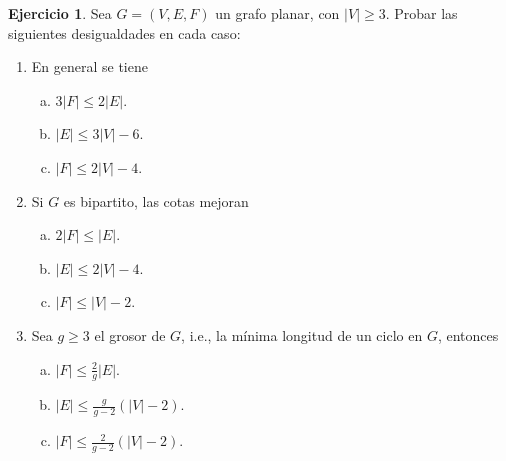 \documentclass[12pt]{report}
\theoremstyle{plain}
\theoremstyle{definition}
\newtheorem{exercise}[theorem]{Ejercicio}
\newcommand{\abs}[1]{\left \vert #1 \right \vert}
\begin{document}
\begin{exercise}\label{ejercicio:desigualdades para cantidad de caras aristas y vertices de grafos planares}
Sea $G = (V,E,F)$ un grafo planar, con $\abs V \geq 3$. Probar las siguientes desigualdades en cada caso:
\begin{enumerate}
\item En general se tiene
\begin{enumerate}[(a)]
\item $3 \abs F \leq 2 \abs E$.
\item $\abs E \leq 3 \abs V - 6$.
\item $\abs F \leq 2 \abs V - 4$.
\end{enumerate}
\item Si $G$ es bipartito, las cotas mejoran
\begin{enumerate}[(a)]
\item $2 \abs F \leq \abs E$.
\item $\abs E \leq 2 \abs V - 4$.
\item $\abs F \leq \abs V - 2$.
\end{enumerate}
\item Sea $g \geq 3$ el grosor de $G$, i.e., la mínima longitud de un ciclo en $G$, entonces
\begin{enumerate}[(a)]
\item $\abs F \leq \frac 2 g \abs E$.
\item $\abs E \leq \frac g {g-2} (\abs V - 2)$.
\item $\abs F \leq \frac 2 {g-2} ( \abs V -2 )$.
\end{enumerate}
\end{enumerate}
\end{exercise}
\end{document}
